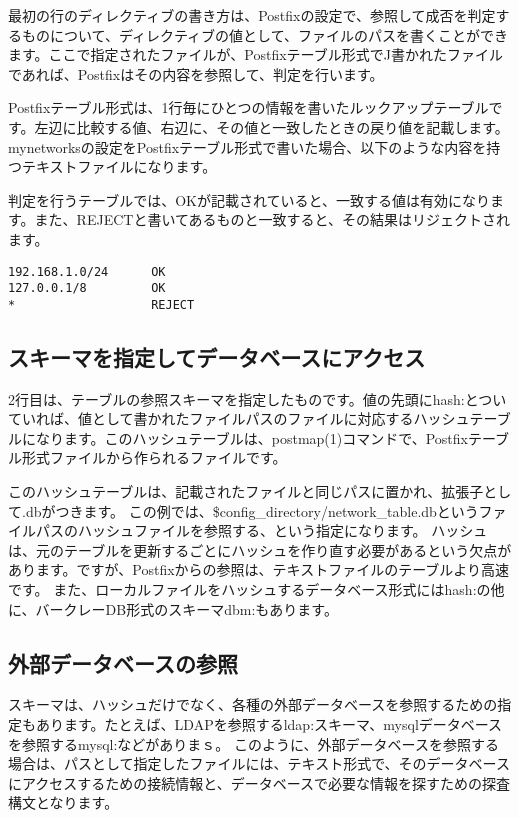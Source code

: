 最初の行のディレクティブの書き方は、Postfixの設定で、参照して成否を判定するものについて、ディレクティブの値として、ファイルのパスを書くことができます。ここで指定されたファイルが、Postfixテーブル形式でJ書かれたファイルであれば、Postfixはその内容を参照して、判定を行います。

Postfixテーブル形式は、1行毎にひとつの情報を書いたルックアップテーブルです。左辺に比較する値、右辺に、その値と一致したときの戻り値を記載します。mynetworksの設定をPostfixテーブル形式で書いた場合、以下のような内容を持つテキストファイルになります。

判定を行うテーブルでは、OKが記載されていると、一致する値は有効になります。また、REJECTと書いてあるものと一致すると、その結果はリジェクトされます。

\begin{lstlisting}[basicstyle=\ttfamily\footnotesize, frame=single]
192.168.1.0/24      OK
127.0.0.1/8         OK
*                   REJECT
\end{lstlisting}

\subsection{スキーマを指定してデータベースにアクセス}

2行目は、テーブルの参照スキーマを指定したものです。値の先頭にhash:とついていれば、値として書かれたファイルパスのファイルに対応するハッシュテーブルになります。このハッシュテーブルは、postmap(1)コマンドで、Postfixテーブル形式ファイルから作られるファイルです。

このハッシュテーブルは、記載されたファイルと同じパスに置かれ、拡張子として.dbがつきます。
この例では、\$config\_directory/network\_table.dbというファイルパスのハッシュファイルを参照する、という指定になります。
ハッシュは、元のテーブルを更新するごとにハッシュを作り直す必要があるという欠点があります。ですが、Postfixからの参照は、テキストファイルのテーブルより高速です。
また、ローカルファイルをハッシュするデータベース形式にはhash:の他に、バークレーDB形式のスキーマdbm:もあります。

\subsection{外部データベースの参照}

スキーマは、ハッシュだけでなく、各種の外部データベースを参照するための指定もあります。たとえば、LDAPを参照するldap:スキーマ、mysqlデータベースを参照するmysql:などがありまｓ。
このように、外部データベースを参照する場合は、パスとして指定したファイルには、テキスト形式で、そのデータベースにアクセスするための接続情報と、データベースで必要な情報を探すための探査構文となります。

